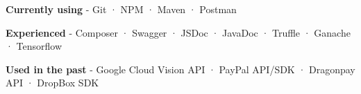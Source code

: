 \begin{cventries}
    {} %
    {
      \begin{cvitems} %
        \item {\textbf{Currently using} \hspace{0.03cm} - \hspace{0.03cm} Git \hspace{0.03cm} · \hspace{0.03cm} NPM \hspace{0.03cm} · \hspace{0.03cm} Maven \hspace{0.03cm} · \hspace{0.03cm} Postman} %
        \item {\textbf{Experienced} \hspace{0.03cm} - \hspace{0.03cm} Composer \hspace{0.03cm} · \hspace{0.03cm} Swagger \hspace{0.03cm} · \hspace{0.03cm} JSDoc \hspace{0.03cm} · \hspace{0.03cm} JavaDoc \hspace{0.03cm} · \hspace{0.03cm} Truffle \hspace{0.03cm} · \hspace{0.03cm} Ganache \hspace{0.03cm} · \hspace{0.03cm} Tensorflow} %
        \item {\textbf{Used in the past} \hspace{0.03cm} - \hspace{0.03cm} Google Cloud Vision API \hspace{0.03cm} · \hspace{0.03cm} PayPal API/SDK \hspace{0.03cm} · \hspace{0.03cm} Dragonpay API \hspace{0.03cm} · \hspace{0.03cm} DropBox SDK \\} %
      \end{cvitems}
    }

\end{cventries}